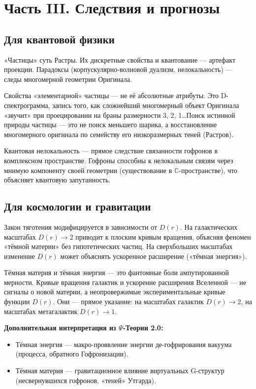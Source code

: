\documentclass[a4paper,12pt]{article}
\begin{document}
\newpage
\section{Часть III. Следствия и прогнозы}

\subsection{Для квантовой физики}

«Частицы» суть Растры. Их дискретные свойства и квантование — артефакт проекции. Парадоксы (корпускулярно-волновой дуализм, нелокальность) — следы многомерной геометрии Оригинала.

Свойства «элементарной» частицы — не её абсолютные атрибуты. Это D-спектрограмма, запись того, как сложнейший многомерный объект Оригинала «звучит» при проецировании на браны размерности 3, 2, 1\dots Поиск истинной природы частицы — это не поиск меньшего шарика, а восстановление многомерного оригинала по семейству его низкоразмерных теней (Растров).

Квантовая нелокальность — прямое следствие связанности гофронов в комплексном пространстве. Гофроны способны к нелокальным связям через мнимую компоненту своей геометрии (существование в $\mathbb{C}$-пространстве), что объясняет квантовую запутанность.

\subsection{Для космологии и гравитации}

Закон тяготения модифицируется в зависимости от $D(r)$. На галактических масштабах $D(r) \to 2$ приводит к плоским кривым вращения, объясняя феномен «тёмной материи» без гипотетических частиц. На сверхбольших масштабах изменение $D(r)$ может объяснять ускоренное расширение («тёмная энергия»).

Тёмная материя и тёмная энергия — это фантомные боли ампутированной мерности. Кривые вращения галактик и ускорение расширения Вселенной — не сигналы о новой материи, а неопровержимые экспериментальные кривые функции $D(r)$. Они — прямое указание: на масштабах галактик $D(r) \to 2$, на масштабах метагалактик $D(r) \to 1$.

\textbf{Дополнительная интерпретация из $\Psi$-Теории 2.0:}
\begin{itemize}
	\item Тёмная энергия — макро-проявление энергии де-гофрирования вакуума (процесса, обратного Гофронизации).
	\item Тёмная материя — гравитационное влияние виртуальных G-структур (несвернувшихся гофронов, «теней» Утгарда).
\end{itemize}
\end{document}
